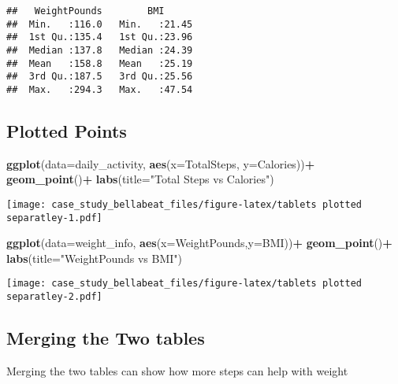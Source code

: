 \documentclass[
]{article}
\newenvironment{Shaded}{\begin{snugshade}}{\end{snugshade}}
\newcommand{\AttributeTok}[1]{\textcolor[rgb]{0.13,0.29,0.53}{#1}}
\newcommand{\FunctionTok}[1]{\textcolor[rgb]{0.13,0.29,0.53}{\textbf{#1}}}
\newcommand{\NormalTok}[1]{#1}
\newcommand{\SpecialCharTok}[1]{\textcolor[rgb]{0.81,0.36,0.00}{\textbf{#1}}}
\newcommand{\StringTok}[1]{\textcolor[rgb]{0.31,0.60,0.02}{#1}}
\begin{document}
\begin{verbatim}
##   WeightPounds        BMI       
##  Min.   :116.0   Min.   :21.45  
##  1st Qu.:135.4   1st Qu.:23.96  
##  Median :137.8   Median :24.39  
##  Mean   :158.8   Mean   :25.19  
##  3rd Qu.:187.5   3rd Qu.:25.56  
##  Max.   :294.3   Max.   :47.54
\end{verbatim}

\hypertarget{plotted-points}{%
\subsection{Plotted Points}\label{plotted-points}}

\begin{Shaded}
\begin{Highlighting}[]
\FunctionTok{ggplot}\NormalTok{(}\AttributeTok{data=}\NormalTok{daily\_activity, }\FunctionTok{aes}\NormalTok{(}\AttributeTok{x=}\NormalTok{TotalSteps, }\AttributeTok{y=}\NormalTok{Calories))}\SpecialCharTok{+}
  \FunctionTok{geom\_point}\NormalTok{()}\SpecialCharTok{+}
  \FunctionTok{labs}\NormalTok{(}\AttributeTok{title=}\StringTok{"Total Steps vs Calories"}\NormalTok{)}
\end{Highlighting}
\end{Shaded}

\texttt{[image: case\_study\_bellabeat\_files/figure-latex/tablets plotted separatley-1.pdf]}

\begin{Shaded}
\begin{Highlighting}[]
\FunctionTok{ggplot}\NormalTok{(}\AttributeTok{data=}\NormalTok{weight\_info, }\FunctionTok{aes}\NormalTok{(}\AttributeTok{x=}\NormalTok{WeightPounds,}\AttributeTok{y=}\NormalTok{BMI))}\SpecialCharTok{+}
  \FunctionTok{geom\_point}\NormalTok{()}\SpecialCharTok{+}
  \FunctionTok{labs}\NormalTok{(}\AttributeTok{title=}\StringTok{"WeightPounds vs BMI"}\NormalTok{)}
\end{Highlighting}
\end{Shaded}

\texttt{[image: case\_study\_bellabeat\_files/figure-latex/tablets plotted separatley-2.pdf]}

\hypertarget{merging-the-two-tables}{%
\subsection{Merging the Two tables}\label{merging-the-two-tables}}

Merging the two tables can show how more steps can help with weight
\end{document}
